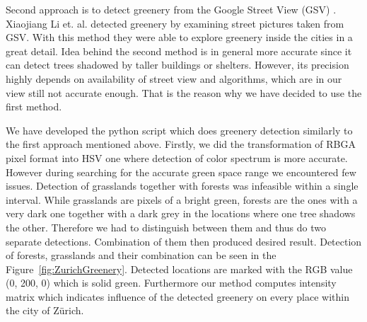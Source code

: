 \documentclass[letterpaper]{article}
\begin{document}
\indent Second approach is to detect greenery from the Google Street View (GSV) \cite{googleView}. Xiaojiang Li et. al. detected greenery by examining street
pictures taken from GSV. With this method they were able to explore greenery inside the cities in a great detail. Idea behind the second method is in general
more accurate since it can detect trees shadowed by taller buildings or shelters. However, its precision highly depends on availability of street view and
algorithms, which are in our view still not accurate enough. That is the reason why we have decided to use the first method.

\indent We have developed the python script which does greenery detection similarly to the first approach mentioned above.
Firstly, we did the transformation of RBGA pixel format into HSV one where detection of color spectrum is more accurate.
However during searching for the accurate green space range we encountered few issues. Detection of grasslands together
with forests was infeasible within a single interval. While grasslands are pixels of a bright green, forests are
the ones with a very dark one together with a dark grey in the locations where one tree shadows the other.
Therefore we had to distinguish between them and thus do two separate detections. Combination of them then
produced desired result. Detection of forests, grasslands and their combination can be seen in the Figure~\ref{fig:ZurichGreenery}.
Detected locations are marked with the RGB value (0, 200, 0) which is solid green. Furthermore our method computes intensity matrix
which indicates influence of the detected greenery on every place within the city of Zürich.
\end{document}
